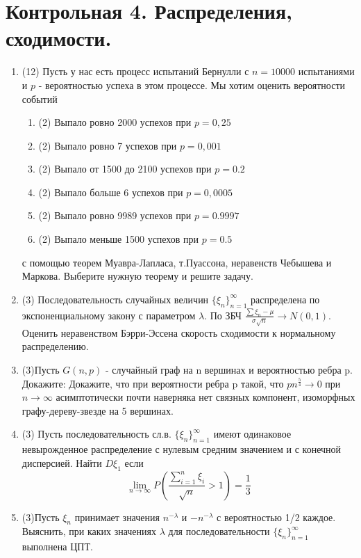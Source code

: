 \documentclass[a4paper, 14pt]{extarticle}
\begin{document}
\section*{Контрольная 4. Распределения, сходимости.} 
\begin{enumerate}

\item (12) Пусть у нас есть процесс испытаний Бернулли с $n = 10000$ испытаниями и $p$ - вероятностью успеха в этом процессе.
Мы хотим оценить вероятности событий 
\begin{enumerate}
\item (2) Выпало ровно 2000 успехов при $p=0,25$
\item (2) Выпало ровно 7 успехов при $p=0,001$
\item (2) Выпало от 1500 до 2100 успехов при $p=0.2$
\item (2) Выпало больше 6 успехов при $p=0,0005$
\item (2) Выпало ровно 9989 успехов при $p=0.9997$
\item (2) Выпало меньше 1500 успехов при $p=0.5$
\end{enumerate}
с помощью теорем Муавра-Лапласа, т.Пуассона, неравенств Чебышева и Маркова.
Выберите нужную теорему и решите задачу.

\item (3) Последовательность случайных величин $\{\xi_n\}_{n=1}^{\infty}$ распределена по экспоненциальному закону с параметром $\lambda$. 
По ЗБЧ $\frac{\sum \xi_n - \mu}{\sigma \sqrt{n}} \to N(0,1)$. 
Оценить неравенством Бэрри-Эссена скорость сходимости к нормальному распределению.

\item (3)Пусть $G(n,p)$ - случайный граф на n вершинах и вероятностью ребра p. Докажите: 
Докажите, что при вероятности ребра p такой, что $pn^{\frac{5}{4}} \to 0$ при $n \to \infty$ асимптотически почти наверняка нет связных компонент, изоморфных графу-дереву-звезде на 5 вершинах. 

\item (3) Пусть последовательность сл.в. $\{\xi_n\}_{n=1}^{\infty}$ имеют одинаковое 
невырожденное распределение с нулевым средним значением и с конечной дисперсией. 
Найти $D\xi_1$ если
$$\lim_{n\to\infty}P(\frac{\sum_{i=1}^{n}\xi_i}{\sqrt{n}} > 1) = \frac{1}{3}$$

\item (3)Пусть $\xi_n$ принимает значения $n^{-\lambda}$ и $-n^{-\lambda}$ 
с вероятностью 1/2
каждое. Выяснить, при каких значениях $\lambda$ для последовательности $\{\xi_n\}_{n=1}^{\infty}$
выполнена ЦПТ.


\end{enumerate}
\end{document}
